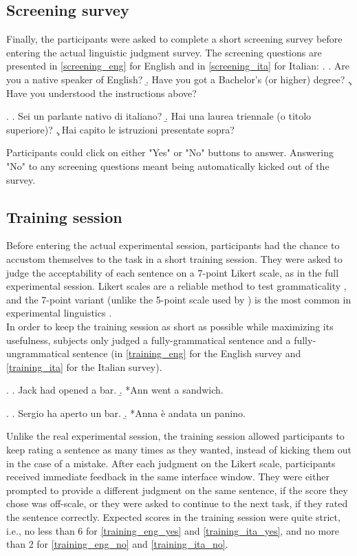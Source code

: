 \subsection{Screening survey} 
Finally, the participants were asked to complete a short screening survey before entering the actual linguistic judgment survey. The screening questions are presented in \ref{screening_eng} for English and in \ref{screening_ita} for Italian:
\ex. \label{screening_eng} \a. Are you a native speaker of English?
\b. Have you got a Bachelor's (or higher) degree?
\c. Have you understood the instructions above?

\ex. \label{screening_ita} \a. Sei un parlante nativo di italiano?
\b. Hai una laurea triennale (o titolo superiore)?
\c. Hai capito le istruzioni presentate sopra?

Participants could click on either "Yes" or "No" buttons to answer. Answering "No" to any screening questions meant being automatically kicked out of the survey.

\subsection{Training session} 
Before entering the actual experimental session, participants had the chance to accustom themselves to the task in a short training session. They were asked to judge the acceptability of each sentence on a 7-point Likert scale, as in the full experimental session. Likert scales are a reliable method to test grammaticality \parencite{WeskottFanselow2011}, and the 7-point variant (unlike the 5-point scale used by \textcite{Medina2007}) is the most common in experimental linguistics \parencite{Juzek2016}.\\ In order to keep the training session as short as possible while maximizing its usefulness, subjects only judged a fully-grammatical sentence and a fully-ungrammatical sentence (in \ref{training_eng} for the English survey and \ref{training_ita} for the Italian survey).

\ex. \label{training_eng} \a. \label{training_eng_yes} Jack had opened a bar.
\b. \label{training_eng_no} *Ann went a sandwich.

\ex. \label{training_ita} \a. \label{training_ita_yes} Sergio ha aperto un bar.
\b. \label{training_ita_no} *Anna è andata un panino.

Unlike the real experimental session, the training session allowed participants to keep rating a sentence as many times as they wanted, instead of kicking them out in the case of a mistake. After each judgment on the Likert scale, participants received immediate feedback in the same interface window. They were either prompted to provide a different judgment on the same sentence, if the score they chose was off-scale, or they were asked to continue to the next task, if they rated the sentence correctly. Expected scores in the training session were quite strict, i.e., no less than 6 for \ref{training_eng_yes} and \ref{training_ita_yes}, and no more than 2 for \ref{training_eng_no} and \ref{training_ita_no}.

